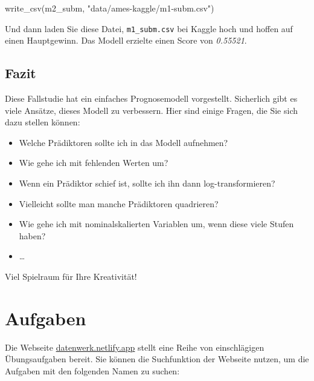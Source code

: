 \documentclass[
  letterpaper,
  twoside,
  open=any]{scrbook}
\newenvironment{Shaded}{\begin{snugshade}}{\end{snugshade}}
\newcommand{\FunctionTok}[1]{\textcolor[rgb]{0.28,0.35,0.67}{#1}}
\newcommand{\NormalTok}[1]{\textcolor[rgb]{0.00,0.23,0.31}{#1}}
\newcommand{\StringTok}[1]{\textcolor[rgb]{0.13,0.47,0.30}{#1}}
\providecommand{\tightlist}{%
  \setlength{\itemsep}{0pt}\setlength{\parskip}{0pt}}\usepackage{longtable,booktabs,array}
\theoremstyle{definition}
\theoremstyle{definition}
\theoremstyle{definition}
\theoremstyle{remark}
\begin{document}
\begin{Shaded}
\begin{Highlighting}[]
\FunctionTok{write\_csv}\NormalTok{(m2\_subm, }\StringTok{"data/ames{-}kaggle/m1{-}subm.csv"}\NormalTok{)}
\end{Highlighting}
\end{Shaded}

Und dann laden Sie diese Datei, \texttt{m1\_subm.csv} bei Kaggle hoch
und hoffen auf einen Hauptgewinn. Das Modell erzielte einen Score von
\emph{0.55521}.

\subsection{Fazit}\label{fazit-3}

Diese Fallstudie hat ein einfaches Prognosemodell vorgestellt.
Sicherlich gibt es viele Ansätze, dieses Modell zu verbessern. Hier sind
einige Fragen, die Sie sich dazu stellen können:

\begin{itemize}
\tightlist
\item
  Welche Prädiktoren sollte ich in das Modell aufnehmen?
\item
  Wie gehe ich mit fehlenden Werten um?
\item
  Wenn ein Prädiktor schief ist, sollte ich ihn dann log-transformieren?
\item
  Vielleicht sollte man manche Prädiktoren quadrieren?
\item
  Wie gehe ich mit nominalskalierten Variablen um, wenn diese viele
  Stufen haben?
\item
  \ldots{}
\end{itemize}

Viel Spielraum für Ihre Kreativität!

\section{Aufgaben}\label{aufgaben-7}

Die Webseite \href{https://datenwerk.netlify.app}{datenwerk.netlify.app}
stellt eine Reihe von einschlägigen Übungsaufgaben bereit. Sie können
die Suchfunktion der Webseite nutzen, um die Aufgaben mit den folgenden
Namen zu suchen:
\end{document}
